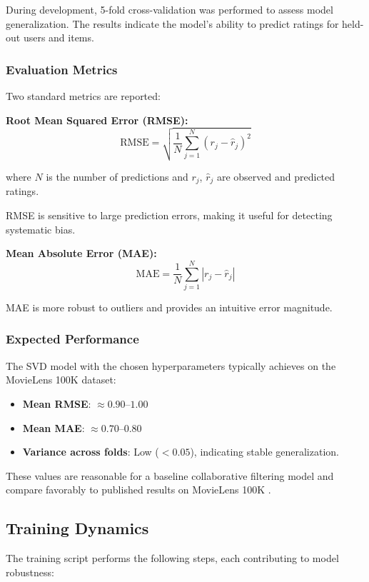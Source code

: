 During development, 5-fold cross-validation was performed to assess model generalization. The results 
indicate the model's ability to predict ratings for held-out users and items.

\subsubsection{Evaluation Metrics}

Two standard metrics are reported:

\textbf{Root Mean Squared Error (RMSE):}
\[
  \text{RMSE} = \sqrt{\frac{1}{N} \sum_{j=1}^{N} (r_j - \hat{r}_j)^2}
\]

where $N$ is the number of predictions and $r_j$, $\hat{r}_j$ are observed and predicted ratings.

RMSE is sensitive to large prediction errors, making it useful for detecting systematic bias.

\textbf{Mean Absolute Error (MAE):}
\[
  \text{MAE} = \frac{1}{N} \sum_{j=1}^{N} |r_j - \hat{r}_j|
\]

MAE is more robust to outliers and provides an intuitive error magnitude.

\subsubsection{Expected Performance}

The SVD model with the chosen hyperparameters typically achieves on the MovieLens 100K dataset:

\begin{itemize}
  \item \textbf{Mean RMSE}: $\approx 0.90$--$1.00$
  \item \textbf{Mean MAE}: $\approx 0.70$--$0.80$
  \item \textbf{Variance across folds}: Low ($< 0.05$), indicating stable generalization.
\end{itemize}

These values are reasonable for a baseline collaborative filtering model and compare favorably to 
published results on MovieLens 100K \citep{koren2009matrix}.

\subsection{Training Dynamics}

The training script performs the following steps, each contributing to model robustness:

